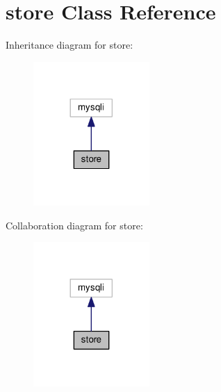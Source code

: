 \hypertarget{classstore}{}\section{store Class Reference}
\label{classstore}


Inheritance diagram for store\+:\nopagebreak
\begin{figure}[H]
\begin{center}
\leavevmode
\includegraphics[width=125pt]{classstore__inherit__graph}
\end{center}
\end{figure}


Collaboration diagram for store\+:\nopagebreak
\begin{figure}[H]
\begin{center}
\leavevmode
\includegraphics[width=125pt]{classstore__coll__graph}
\end{center}
\end{figure}
